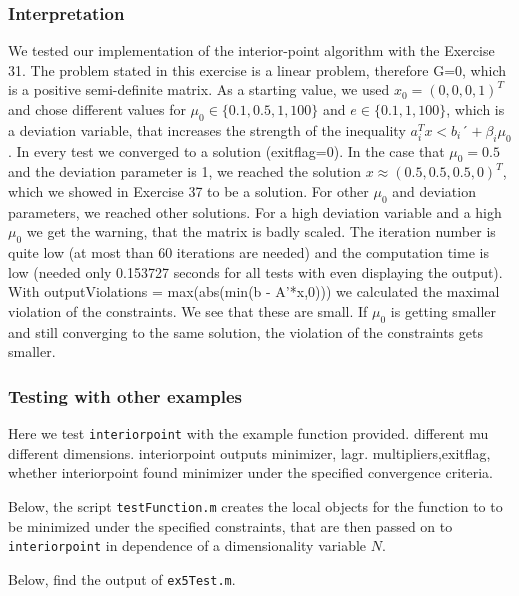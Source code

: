 \documentclass{article}
\begin{document}
\subsubsection{Interpretation}
We tested our implementation of the interior-point algorithm with the Exercise 31. The problem stated in this exercise is a linear problem, therefore G=0, which is a positive semi-definite matrix. As a starting value, we used $x_0=(0,0,0,1)^T$ and chose different values for $\mu_0 \in \{0.1,0.5,1,100\}$ and $e \in \{0.1,1,100\}$, which is a deviation variable, that increases the strength of the inequality $a_i^T x < b_i ´+ \beta_i \mu_0$. In every test we converged to a solution (exitflag=0). In the case that $\mu_0=0.5$ and the deviation parameter is 1, we reached the solution $x \approx (0.5,0.5,0.5,0)^T$, which we showed in Exercise 37 to be a solution. For other $\mu_0$ and deviation parameters, we reached other solutions. For a high deviation variable and a high $\mu_0$ we get the warning, that the matrix is badly scaled. The iteration number is quite low (at most than 60 iterations are needed) and the computation time is low (needed only 0.153727 seconds for all tests with even displaying the output). With  outputViolations = max(abs(min(b - A'*x,0))) we calculated the maximal violation of the constraints. We see that these are small. If $\mu_0$ is getting smaller and still converging to the same solution, the violation of the constraints gets smaller.      
\subsubsection{Testing with other examples}
Here we test \texttt{interiorpoint} with the example function provided. different mu different dimensions. interiorpoint outputs minimizer, lagr. multipliers,exitflag, whether interiorpoint found minimizer under the specified convergence criteria.
 
Below, the script \texttt{testFunction.m} creates the local objects for the function to to be minimized under the specified constraints, that are then passed on to \texttt{interiorpoint} in dependence of a dimensionality variable $N$.

Below, find the output of \texttt{ex5Test.m}. 

\end{document}
